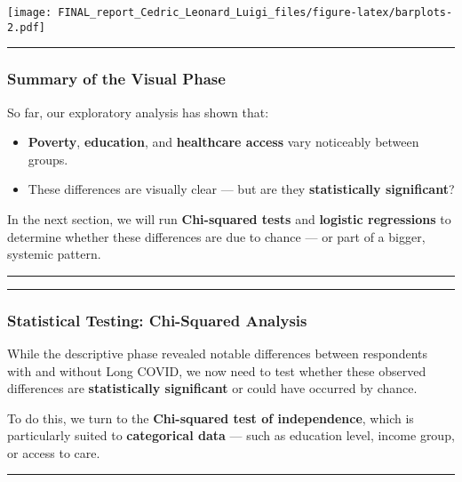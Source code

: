 \documentclass[
]{article}
\providecommand{\tightlist}{%
  \setlength{\itemsep}{0pt}\setlength{\parskip}{0pt}}
\begin{document}
\texttt{[image: FINAL\_report\_Cedric\_Leonard\_Luigi\_files/figure-latex/barplots-2.pdf]}

\begin{center}\rule{0.5\linewidth}{0.5pt}\end{center}

\subsubsection{Summary of the Visual
Phase}\label{summary-of-the-visual-phase}

So far, our exploratory analysis has shown that:

\begin{itemize}
\tightlist
\item
  \textbf{Poverty}, \textbf{education}, and \textbf{healthcare access}
  vary noticeably between groups.
\item
  These differences are visually clear --- but are they
  \textbf{statistically significant}?
\end{itemize}

In the next section, we will run \textbf{Chi-squared tests} and
\textbf{logistic regressions} to determine whether these differences are
due to chance --- or part of a bigger, systemic pattern.

\begin{center}\rule{0.5\linewidth}{0.5pt}\end{center}

\begin{center}\rule{0.5\linewidth}{0.5pt}\end{center}

\subsubsection{Statistical Testing: Chi-Squared
Analysis}\label{statistical-testing-chi-squared-analysis}

While the descriptive phase revealed notable differences between
respondents with and without Long COVID, we now need to test whether
these observed differences are \textbf{statistically significant} or
could have occurred by chance.

To do this, we turn to the \textbf{Chi-squared test of independence},
which is particularly suited to \textbf{categorical data} --- such as
education level, income group, or access to care.

\begin{center}\rule{0.5\linewidth}{0.5pt}\end{center}
\end{document}
